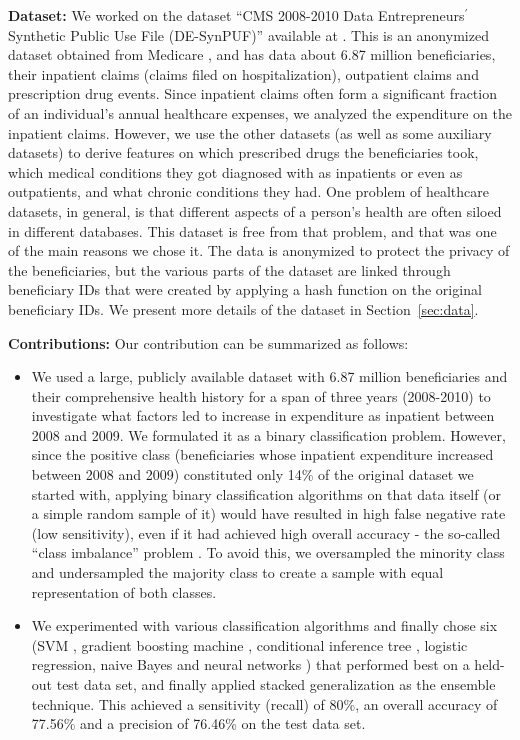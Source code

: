 {\bf Dataset: } We worked on the dataset ``CMS 2008-2010 Data Entrepreneurs$^\prime$ Synthetic Public Use File (DE-SynPUF)'' available at \cite{desynpuf}. This is an anonymized dataset obtained from Medicare \cite{medicare}, and has data about 6.87 million beneficiaries, their inpatient claims (claims filed on hospitalization), outpatient claims and prescription drug events. Since inpatient claims often form a significant fraction of an individual's annual healthcare expenses, we analyzed the expenditure on the inpatient claims. However, we use the other datasets (as well as some auxiliary datasets) to derive features on which prescribed drugs the beneficiaries took, which medical conditions they got diagnosed with as inpatients or even as outpatients, and what chronic conditions they had. One problem of healthcare datasets, in general, is that different aspects of a person's health are often siloed in different databases. This dataset is free from that problem, and that was one of the main reasons we chose it. 
The data is anonymized to protect the privacy of the beneficiaries, but the various parts of the dataset are linked through beneficiary IDs that were created by applying a hash function on the original beneficiary IDs. We present more details of the dataset in Section~\ref{sec:data}.

{\bf Contributions:} Our contribution can be summarized as follows:
\begin{itemize}
\item We used a large, publicly available dataset with 6.87 million beneficiaries and their comprehensive health history for a span of three years (2008-2010) to investigate what factors led to increase in expenditure as inpatient between 2008 and 2009. We formulated it as a binary classification problem. However, since the positive class (beneficiaries whose inpatient expenditure increased between 2008 and 2009) constituted only 14\% of the original dataset we started with, applying binary classification algorithms on that data itself (or a simple random sample of it) would have resulted in high false negative rate (low sensitivity), even if it had achieved high overall accuracy - the so-called ``class imbalance'' problem \cite{FP00}. To avoid this, we oversampled the minority class and undersampled the majority class to create a sample with equal representation of both classes.  
\item We experimented with various classification algorithms and finally chose six (SVM \cite{CV95}, gradient boosting machine \cite{Friedman01}, conditional inference tree \cite{HHZ06}, logistic regression, naive Bayes and neural networks \cite{Ripley96}) that performed best on a held-out test data set, and finally applied stacked generalization \cite{Wolpert92} as the ensemble technique. This achieved a sensitivity (recall) of 80\%, an overall accuracy of 77.56\% and a precision of 76.46\% on the test data set. 
\end{itemize}

 
